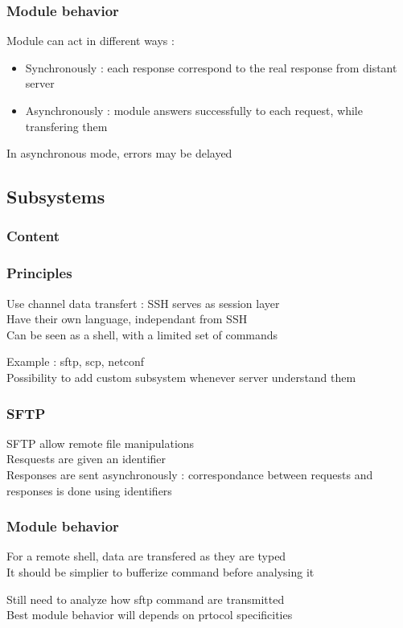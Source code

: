 \documentclass{beamer}
\begin{document}
\begin{frame}
\frametitle{Module behavior}
Module can act in different ways :

\begin{itemize}
\item Synchronously : each response correspond to the real response from distant server
\item Asynchronously : module answers successfully to each request, while transfering them
\end{itemize}

In asynchronous mode, errors may be delayed

\end{frame}



\subsection{Subsystems}

\begin{frame}
\frametitle{Content}
\tableofcontents[currentsubsection]
\end{frame}


\begin{frame}
\frametitle{Principles}


Use channel data transfert : SSH serves as session layer\\
Have their own language, independant from SSH\\
Can be seen as a shell, with  a limited set of commands

\vspace{8mm}
Example : sftp, scp, netconf\\
Possibility to add custom subsystem whenever server understand them

\end{frame}


\begin{frame}
\frametitle{SFTP}

SFTP allow remote file manipulations\\
Resquests are given an identifier\\

Responses are sent asynchronously : correspondance between requests and responses is done using identifiers


\end{frame}


\begin{frame}
\frametitle{Module behavior}


For a remote shell, data are transfered as they are typed\\
It should be simplier to bufferize command before analysing it

\vspace{8mm}
Still need to analyze how sftp command are transmitted\\
Best module behavior will depends on prtocol specificities


\end{frame}
\end{document}
